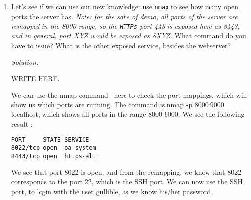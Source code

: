 \documentclass[a4paper,11pt]{article}
\newenvironment{solution}%
{\par{\noindent\small\textit{Solution:}}\vspace{-12pt}\begin{framed}}%
{\end{framed}\par}
\begin{document}
\begin{enumerate}
\ifsolution\begin{solution}
On this system, the vulnerability due to the web server, helps us access the shadow file. The shadow file can clearly tell us which users have a password, as it stores the hashes of the password. Below is the contents of the shadow file:
\begin{verbatim}
root:*:16156:0:99999:7:::
daemon:*:16156:0:99999:7:::
bin:*:16156:0:99999:7:::
sys:*:16156:0:99999:7:::
sync:*:16156:0:99999:7:::
games:*:16156:0:99999:7:::
man:*:16156:0:99999:7:::
lp:*:16156:0:99999:7:::
mail:*:16156:0:99999:7:::
news:*:16156:0:99999:7:::
uucp:*:16156:0:99999:7:::
proxy:*:16156:0:99999:7:::
www-data:*:16156:0:99999:7:::
backup:*:16156:0:99999:7:::
list:*:16156:0:99999:7:::
irc:*:16156:0:99999:7:::
gnats:*:16156:0:99999:7:::
nobody:*:16156:0:99999:7:::
libuuid:!:16156:0:99999:7:::
syslog:*:16156:0:99999:7:::
gullible:$6$otfLedCx$Bgv4EoVV64KsixpcFqoT79fwoSFIKpoSGtFq0cuZJiUhcnuVG
ccbhCloIwXezcQ96aniNLmtXo31GIAr/XIdH0:18928:0:99999:7:::
sshd:*:18928:0:99999:7:::
\end{verbatim}
From observation, we can see that the user gullible has the hash of the password stored, after the second \$ sign in the entry of gullible, the hash of password is stored.

John the Ripper gives: password = invulnerable 
\end{solution}\fi

\item Let's see if we can use our new knowledge: use \texttt{nmap} to see how many open ports the server has. \textit{Note: for the sake of demo, all ports of the server are remapped in the 8000 range, so the \texttt{HTTPs} port 443 is exposed here as 8443, and in general, port XYZ would be exposed as 8XYZ.} What command do you have to issue? What is the other exposed service, besides the webserver?

\ifsolution\begin{solution}
WRITE HERE.

We can use the nmap command~\cite{web4} here to check the port mappings, which will show us which ports are running. The command is nmap -p 8000:9000 localhost, which shows all ports in the range 8000-9000. We see the following result :
\begin{verbatim}
PORT     STATE SERVICE
8022/tcp open  oa-system
8443/tcp open  https-alt
\end{verbatim}

We see that port 8022 is open, and from the remapping, we know that 8022 corresponds to the port 22, which is the SSH port. We can now use the SSH port, to login with the user gullible, as we know his/her password.
\end{solution}\fi


\end{enumerate}
\end{document}
